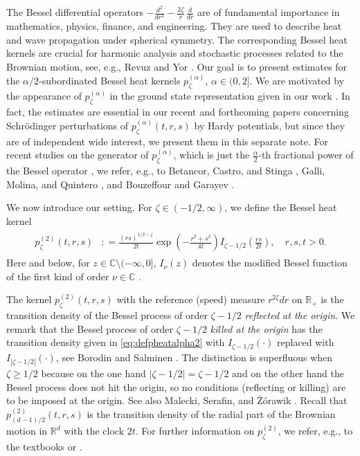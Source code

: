 \documentclass[12pt,reqno,a4paper]{amsart}
\theoremstyle{definition}
\theoremstyle{remark}
\numberwithin{equation}{section}
\newcommand{\1}{\mathbbm{1}}
\newcommand{\C}{\mathbb{C}}
\newcommand{\R}{\mathbb{R}}
\begin{document}
The Bessel differential operators
$-\tfrac{d^2}{dr^2}-\tfrac{2\zeta}{r}\,\tfrac{d}{dr}$ %
are of fundamental importance in mathematics, physics, finance, and engineering. They are used to describe heat and wave propagation under spherical symmetry.
The corresponding Bessel heat kernels are crucial for harmonic analysis and stochastic processes related to the Brownian motion, see, e.g., Revuz and Yor \cite{RevuzYor1999}. Our goal is to present estimates for the $\alpha/2$-subordinated Bessel heat kernels $p_\zeta^{(\alpha)}$, $\alpha\in(0,2]$. We are motivated by the appearance of $p_\zeta^{(\alpha)}$ in the ground state representation given in our work \cite{BogdanMerz2024}. In fact, the estimates are essential in our recent and forthcoming papers \cite{Bogdanetal2024,BogdanMerz2024H} concerning Schr\"odinger perturbations of $p_\zeta^{(\alpha)}(t,r,s)$ by Hardy potentials, but since they are of independent wide interest, we present them in this separate note.
For recent studies on the generator of $p_\zeta^{(\alpha)}$, which is just the $\tfrac{\alpha}{2}$-th fractional power of the Bessel operator \cite{BogdanMerz2024,BouzeffourGarayev2022}, we refer, e.g., to Betancor, Castro, and Stinga \cite{Betancoretal2014}, Galli, Molina, and Quintero \cite{Gallietal2022}, and Bouzeffour and Garayev \cite{BouzeffourGarayev2022}.

\smallskip
We now introduce our setting. For $\zeta\in(-1/2,\infty)$, we define the Bessel heat kernel
\begin{align}
  \label{eq:defpheatalpha2}
  \begin{split}
    p_\zeta^{(2)}(t,r,s) & : = \frac{(rs)^{1/2-\zeta}}{2t}\exp\left(-\frac{r^2+s^2}{4t}\right)I_{\zeta-1/2}\left(\frac{rs}{2t}\right), \quad r,s,t>0.
  \end{split}
\end{align}Here and below, for $z\in\C\setminus(-\infty,0]$, $I_\nu(z)$ denotes the modified Bessel function of the first kind of order $\nu\in\C$ \cite[(10.25.2)]{NIST:DLMF}.

The kernel $p_\zeta^{(2)}(t,r,s)$ with the reference (speed) measure $r^{2\zeta}dr$ on $\R_+$ is the transition density of the Bessel process of order $\zeta-1/2$ \emph{reflected at the origin}.
We remark that the Bessel process of order $\zeta-1/2$ \emph{killed at the origin} has the transition density given in \eqref{eq:defpheatalpha2} with $I_{\zeta-1/2}(\cdot)$ replaced with $I_{|\zeta-1/2|}(\cdot)$, see Borodin and Salminen \cite[Appendix~1.21, p.~133--134]{BorodinSalminen2002}. The distinction is superfluous when $\zeta\geq1/2$ because on the one hand $|\zeta-1/2|=\zeta-1/2$ and on the other hand the Bessel process does not hit the origin, so no conditions (reflecting or killing) are to be imposed at the origin. See also Malecki, Serafin, and {\.Z}{\'o}rawik \cite{Maleckietal2016}. Recall that $p_{(d-1)/2}^{(2)}(t,r,s)$ is the transition density of the radial part of the Brownian motion in $\R^d$ with the clock $2t$.
For further information on $p_\zeta^{(2)}$,
we refer, e.g., to the textbooks \cite[Part I, Section~IV.6 or Appendix~1.21]{BorodinSalminen2002} or \cite[Chapter~XI]{RevuzYor1999}.
\end{document}
